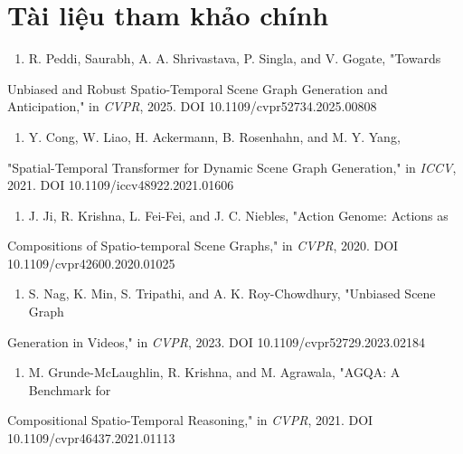 \documentclass[11pt,a4paper]{article}
\begin{document}
\section{Tài liệu tham khảo chính}
\begin{enumerate}\itemsep2pt
\item R. Peddi, Saurabh, A. A. Shrivastava, P. Singla, and V. Gogate, "Towards
\end{enumerate}
Unbiased and Robust Spatio-Temporal Scene Graph Generation and Anticipation," in \emph{CVPR}, 2025. DOI 10.1109/cvpr52734.2025.00808

\begin{enumerate}\itemsep2pt
\item Y. Cong, W. Liao, H. Ackermann, B. Rosenhahn, and M. Y. Yang,
\end{enumerate}
"Spatial-Temporal Transformer for Dynamic Scene Graph Generation," in \emph{ICCV}, 2021. DOI 10.1109/iccv48922.2021.01606

\begin{enumerate}\itemsep2pt
\item J. Ji, R. Krishna, L. Fei-Fei, and J. C. Niebles, "Action Genome: Actions as
\end{enumerate}
Compositions of Spatio-temporal Scene Graphs," in \emph{CVPR}, 2020. DOI 10.1109/cvpr42600.2020.01025

\begin{enumerate}\itemsep2pt
\item S. Nag, K. Min, S. Tripathi, and A. K. Roy-Chowdhury, "Unbiased Scene Graph
\end{enumerate}
Generation in Videos," in \emph{CVPR}, 2023. DOI 10.1109/cvpr52729.2023.02184

\begin{enumerate}\itemsep2pt
\item M. Grunde-McLaughlin, R. Krishna, and M. Agrawala, "AGQA: A Benchmark for
\end{enumerate}
Compositional Spatio-Temporal Reasoning," in \emph{CVPR}, 2021. DOI 10.1109/cvpr46437.2021.01113
\end{document}
